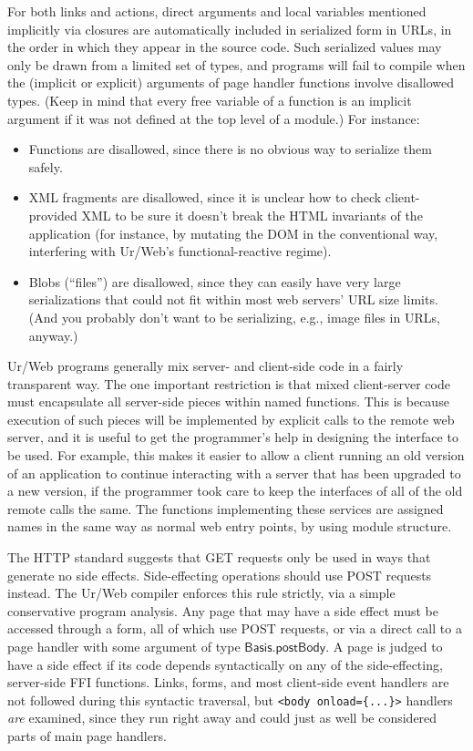 \documentclass{article}
\newcommand{\mt}[1]{\mathsf{#1}}
\begin{document}
For both links and actions, direct arguments and local variables mentioned implicitly via closures are automatically included in serialized form in URLs, in the order in which they appear in the source code.  Such serialized values may only be drawn from a limited set of types, and programs will fail to compile when the (implicit or explicit) arguments of page handler functions involve disallowed types.  (Keep in mind that every free variable of a function is an implicit argument if it was not defined at the top level of a module.)  For instance:
\begin{itemize}
  \item Functions are disallowed, since there is no obvious way to serialize them safely.
  \item XML fragments are disallowed, since it is unclear how to check client-provided XML to be sure it doesn't break the HTML invariants of the application (for instance, by mutating the DOM in the conventional way, interfering with Ur/Web's functional-reactive regime).
  \item Blobs (``files'') are disallowed, since they can easily have very large serializations that could not fit within most web servers' URL size limits.  (And you probably don't want to be serializing, e.g., image files in URLs, anyway.)
\end{itemize}

Ur/Web programs generally mix server- and client-side code in a fairly transparent way.  The one important restriction is that mixed client-server code must encapsulate all server-side pieces within named functions.  This is because execution of such pieces will be implemented by explicit calls to the remote web server, and it is useful to get the programmer's help in designing the interface to be used.  For example, this makes it easier to allow a client running an old version of an application to continue interacting with a server that has been upgraded to a new version, if the programmer took care to keep the interfaces of all of the old remote calls the same.  The functions implementing these services are assigned names in the same way as normal web entry points, by using module structure.

\medskip

The HTTP standard suggests that GET requests only be used in ways that generate no side effects.  Side-effecting operations should use POST requests instead.  The Ur/Web compiler enforces this rule strictly, via a simple conservative program analysis.  Any page that may have a side effect must be accessed through a form, all of which use POST requests, or via a direct call to a page handler with some argument of type $\mt{Basis.postBody}$.  A page is judged to have a side effect if its code depends syntactically on any of the side-effecting, server-side FFI functions.  Links, forms, and most client-side event handlers are not followed during this syntactic traversal, but \texttt{<body onload=\{...\}>} handlers \emph{are} examined, since they run right away and could just as well be considered parts of main page handlers.
\end{document}
